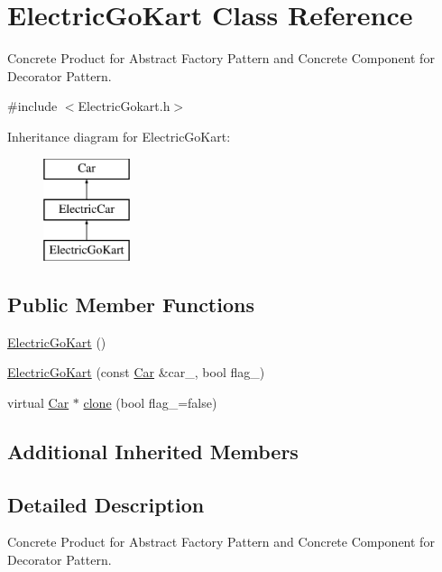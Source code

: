 \hypertarget{class_electric_go_kart}{}\section{Electric\+Go\+Kart Class Reference}
\label{class_electric_go_kart}


Concrete Product for Abstract Factory Pattern and Concrete Component for Decorator Pattern.  




{\ttfamily \#include $<$Electric\+Gokart.\+h$>$}

Inheritance diagram for Electric\+Go\+Kart\+:\begin{figure}[H]
\begin{center}
\leavevmode
\includegraphics[height=3.000000cm]{class_electric_go_kart}
\end{center}
\end{figure}
\subsection*{Public Member Functions}
\begin{DoxyCompactItemize}
\item 
\mbox{\hyperlink{class_electric_go_kart_aa48c98395080aec1ddebdb633327f9ab}{Electric\+Go\+Kart}} ()
\item 
\mbox{\hyperlink{class_electric_go_kart_adc3a6b04ae5466f1a05ca6546e2e942e}{Electric\+Go\+Kart}} (const \mbox{\hyperlink{class_car}{Car}} \&car\+\_\+, bool flag\+\_\+)
\item 
virtual \mbox{\hyperlink{class_car}{Car}} $\ast$ \mbox{\hyperlink{class_electric_go_kart_a56f6b0c5a68597601f27818f10862bcb}{clone}} (bool flag\+\_\+=false)
\end{DoxyCompactItemize}
\subsection*{Additional Inherited Members}


\subsection{Detailed Description}
Concrete Product for Abstract Factory Pattern and Concrete Component for Decorator Pattern. 


